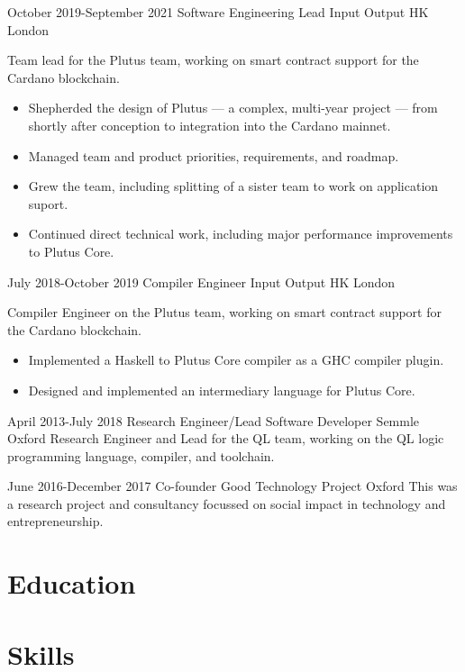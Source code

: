 \documentclass[12pt,a4paper,sans]{moderncv}
\begin{document}
\cventry
{October 2019-September 2021}
{Software Engineering Lead}
{Input Output HK}
{London}
{}
{
  Team lead for the Plutus team, working on smart contract support for the Cardano blockchain.
  \begin{itemize}
    \item Shepherded the design of Plutus --- a  complex, multi-year project --- from shortly after conception to integration into the Cardano mainnet.
    \item Managed team and product priorities, requirements, and roadmap.
    \item Grew the team, including splitting of a sister team to work on application suport.
    \item Continued direct technical work, including major performance improvements to Plutus Core.
  \end{itemize}
}

\cventry
{July 2018-October 2019}
{Compiler Engineer}
{Input Output HK}
{London}
{}
{
  Compiler Engineer on the Plutus team, working on smart contract support for the Cardano blockchain.
  \begin{itemize}
    \item Implemented a Haskell to Plutus Core compiler as a GHC compiler plugin.
    \item Designed and implemented an intermediary language for Plutus Core.
  \end{itemize}
}

\cventry
{April 2013-July 2018}
{Research Engineer/Lead Software Developer}
{Semmle}
{Oxford}
{}
{
  Research Engineer and Lead for the QL team, working on the QL logic programming language, compiler, and toolchain.
}

\cventry
{June 2016-December 2017}
{Co-founder}
{Good Technology Project}
{Oxford}
{}
{
  This was a research project and consultancy focussed on social impact in technology and entrepreneurship. 
}

\section{Education}

\section{Skills}
\end{document}
